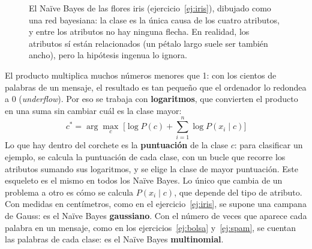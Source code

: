 \documentclass{article}
\begin{document}
\begin{figure}[h]
\centering
{}
\caption{El Naïve Bayes de las flores iris (ejercicio~\ref{ej:iris}), dibujado como una red bayesiana: la clase es la única causa de los cuatro atributos, y entre los atributos no hay ninguna flecha. En realidad, los atributos sí están relacionados (un pétalo largo suele ser también ancho), pero la hipótesis ingenua lo ignora.}
\label{fig:red}
\end{figure}

El producto multiplica muchos números menores que 1: con los cientos de palabras de un mensaje, el resultado es tan pequeño que el ordenador lo redondea a 0 (\textit{underflow}). Por eso se trabaja con \textbf{logaritmos}, que convierten el producto en una suma sin cambiar cuál es la clase mayor:
\[
c^* = \arg\max_c \; \Big[ \log P(c) + \sum_{i=1}^{n} \log P(x_i \mid c) \Big]
\]
Lo que hay dentro del corchete es la \textbf{puntuación} de la clase $c$: para clasificar un ejemplo, se calcula la puntuación de cada clase, con un bucle que recorre los atributos sumando sus logaritmos, y se elige la clase de mayor puntuación. Este esqueleto es el mismo en todos los Naïve Bayes. Lo único que cambia de un problema a otro es cómo se calcula $P(x_i \mid c)$, que depende del tipo de atributo. Con medidas en centímetros, como en el ejercicio~\ref{ej:iris}, se supone una campana de Gauss: es el Naïve Bayes \textbf{gaussiano}. Con el número de veces que aparece cada palabra en un mensaje, como en los ejercicios~\ref{ej:bolsa} y~\ref{ej:spam}, se cuentan las palabras de cada clase: es el Naïve Bayes \textbf{multinomial}.
\end{document}
